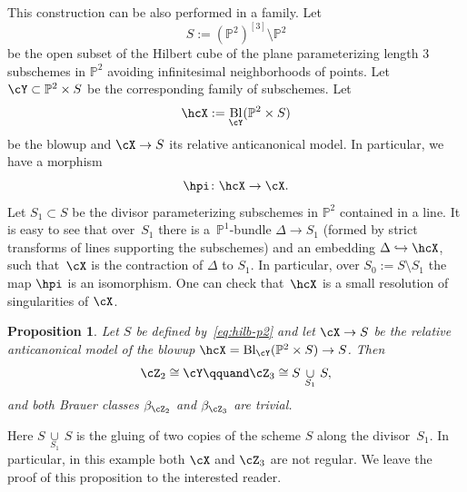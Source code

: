 \documentclass[11pt]{amsart}
\renewcommand{\P}{{\mathbb{P}}}
\DeclareMathOperator{\Bl}{\mathrm{Bl}}
\theoremstyle{plain}
\newtheorem{proposition}[theorem]{Proposition}
\theoremstyle{definition}
\theoremstyle{remark}
\begin{document}
This construction can be also performed in a family.
Let 
\begin{equation}\label{eq:hilb-p2}
S := (\P^2)^{[3]} \setminus \P^2
\end{equation}
be the open subset of the Hilbert cube of the plane parameterizing length 3 subschemes in $\P^2$ avoiding infinitesimal neighborhoods of points.
Let $\cY \subset \P^2 \times S$ be the corresponding family of subschemes.
Let
\begin{equation*}
\hcX := \Bl_\cY(\P^2 \times S)
\end{equation*}
be the blowup and $\cX \to S$ its relative anticanonical model.
In particular, we have a morphism
\begin{equation*}
\hpi \colon \hcX \to \cX.
\end{equation*}
Let $S_1 \subset S$ be the divisor parameterizing subschemes in $\P^2$ contained in a line.
It is easy to see that over~$S_1$ there is a~$\P^1$-bundle $\Delta \to S_1$ (formed by strict transforms of lines supporting the subschemes) 
and an embedding $\Delta \hookrightarrow \hcX$, such that~$\cX$ is the contraction of $\Delta$ to $S_1$.
In particular, over $S_0 := S \setminus S_1$ the map $\hpi$ is an isomorphism.
One can check that~$\hcX$ is a small resolution of singularities of $\cX$.


\begin{proposition}\label{proposition:blowup-p2}
Let $S$ be defined by~\eqref{eq:hilb-p2} and let $\cX \to S$ be the relative anticanonical model of the blowup $\hcX = \Bl_\cY(\P^2 \times S) \to S$.
Then
\begin{equation*}
\cZ_2 \cong \cY
\qquand 
\cZ_3 \cong S \,\mathop\cup\limits_{S_1}\, S,
\end{equation*}
and both Brauer classes $\beta_{\cZ_2}$ and $\beta_{\cZ_3}$ are trivial.
\end{proposition}

Here $S \,\mathop\cup\limits_{S_1}\, S$ is the gluing of two copies of the scheme $S$ along the divisor~$S_1$.
In particular, in this example both $\cX$ and $\cZ_3$ are not regular.
We leave the proof of this proposition to the interested reader.
\end{document}
